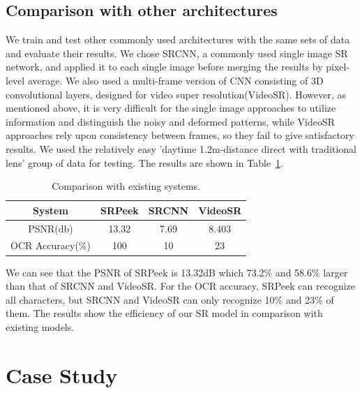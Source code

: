 \subsection{Comparison with other architectures}
We train and test other commonly used architectures with the same sets of data and evaluate their results. We chose SRCNN, a commonly used single image SR network, and applied it to each single image before merging the results by pixel-level average. We also used a multi-frame version of CNN consisting of 3D convolutional layers, designed for video super resolution(VideoSR). However, as mentioned above, it is very difficult for the single image approaches to utilize information and distinguish the noisy and deformed patterns, while VideoSR approaches rely upon consistency between frames, so they fail to give satisfactory results. We used the relatively easy 'daytime 1.2m-distance direct with traditional lens' group of data for testing. The results are shown in Table~\ref{table-comp}.
\begin{table}[!t]
    \centering
    \caption{Comparison with existing systems.}
    \begin{tabular}{@{}cccc@{}}
        \toprule
    System & SRPeek & SRCNN & VideoSR \\ \midrule
    PSNR(db) & 13.32 & 7.69 & 8.403\\ 
    OCR Accuracy(\%) & 100 & 10 & 23\\ \bottomrule
    \end{tabular}
    \label{table-comp}
\end{table}

We can see that the PSNR of SRPeek is 13.32dB which 73.2\% and 58.6\% larger than that of SRCNN and VideoSR. For the OCR accuracy, SRPeek can recognize all characters, but SRCNN and VideoSR can only recognize 10\% and 23\% of them. The results show the efficiency of our SR model in comparison with existing models.

\section{Case Study}
